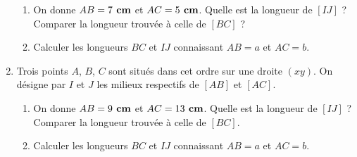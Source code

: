 \begin{enumerate}
\begin{enumerate}
\item On donne $AB= 7\textbf{ cm}$ et $AC = 5\textbf{ cm}$. Quelle est la longueur de $[IJ]$ ? Comparer la longueur trouvée à celle de $[BC]$ ? 
\item Calculer les longueurs $BC$ et $IJ$ connaissant $AB = a$ et $AC = b$. 
\end{enumerate}
\item Trois points $A$, $B$, $C$ sont situés dans cet ordre sur une droite $(xy)$. On désigne par $I$ et $J$ les milieux respectifs de $[AB]$ et $[AC]$. \begin{enumerate}
\item On donne $AB=9\textbf{ cm}$ et $AC=13\textbf{ cm}$. Quelle est la longueur de $[IJ]$ ? Comparer la longueur trouvée à celle de $[BC]$. 
\item Calculer les longueurs $BC$ et $IJ$ connaissant $AB = a$ et $AC = b$. 
\end{enumerate}

\end{enumerate} 